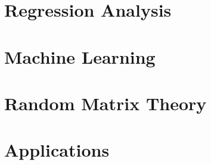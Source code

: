 \documentclass[12pt]{prettybook}
\begin{document}
\part{Regression Analysis}



\part{Machine Learning}





\part{Random Matrix Theory}

\part{Applications}


\appendix

\backmatter
\nocite{*}
\printbibliography
\end{document}
